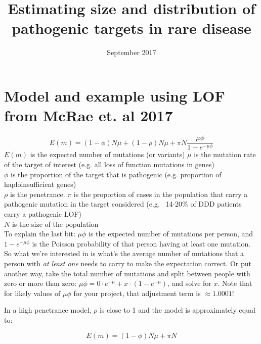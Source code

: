 \documentclass[twoside]{article}
\begin{document}
\linespread{1.3}
\title{Estimating size and distribution of pathogenic targets in rare disease}
\author{}
\date{September 2017}
\maketitle


\section{Model and example using LOF from McRae et. al 2017}

\huge
$$E(m) = (1-\phi)N\mu + (1-\rho)N\mu + \pi N \frac{\mu \phi}{1-e^{-\mu \phi}}$$
\large
$E(m)$ is the expected number of mutations (or variants)
$\mu$ is the mutation rate of the target of interest (e.g. all loss of function mutations in genes)\\
$\phi$ is the proportion of the target that is pathogenic (e.g. proportion of haploinsufficient genes)\\
$\rho$ is the penetrance.
$\pi$ is the proportion of cases in the population that carry a pathogenic mutation in the target considered (e.g. ~14-20\% of DDD patients carry a pathogenic LOF)\\
$N$ is the size of the population\\

\normalsize
To explain the last bit: $\mu \phi$ is the expected number of mutations per person, and $1-e^{-\mu \phi}$ is the Poisson probability of that person having at least one mutation. So what we're interested in is what's the average number of mutations that a person with \emph{at least one} needs to carry to make the expectation correct. Or put another way, take the total number of mutations and split between people with zero or more than zero: $\mu \phi = 0\cdot e^{-\mu} + x \cdot (1-e^{-\mu})$, and solve for $x$. Note that for likely values of $\mu \phi$ for your project, that adjustment term is $\approx 1.0001$! 

In a high penetrance model, $\rho$ is close to 1 and the model is approximately equal to:

\huge
$$E(m) = (1-\phi)N\mu + \pi N $$ \\
\end{document}
